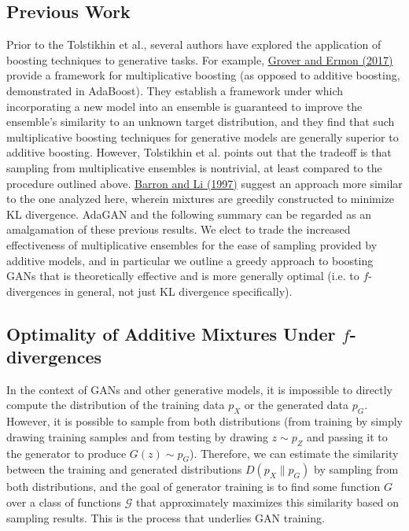 \documentclass[submission]{eptcs}
\newcommand{\calG}{\mathcal G}
\begin{document}
\subsection{Previous Work}

Prior to the Tolstikhin et al., several authors have explored the application of boosting techniques to generative tasks. For example, \href{https://arxiv.org/pdf/1702.08484.pdf}{Grover and Ermon (2017)} provide a framework for multiplicative boosting (as opposed to additive boosting, demonstrated in AdaBoost). They establish a framework under which incorporating a new model into an ensemble is guaranteed to improve the ensemble's similarity to an unknown target distribution, and they find that such multiplicative boosting techniques for generative models are generally superior to additive boosting. However, Tolstikhin et al. points out that the tradeoff is that sampling from multiplicative ensembles is nontrivial, at least compared to the procedure outlined above. \href{https://papers.nips.cc/paper_files/paper/1999/file/a0f3601dc682036423013a5d965db9aa-Paper.pdf}{Barron and Li (1997)} suggest an approach more similar to the one analyzed here, wherein mixtures are greedily constructed to minimize KL divergence. AdaGAN and the following summary can be regarded as an amalgamation of these previous results. We elect to trade the increased effectiveness of multiplicative ensembles for the ease of sampling provided by additive models, and in particular we outline a greedy approach to boosting GANs that is theoretically effective and is more generally optimal (i.e. to $f$-divergences in general, not just KL divergence specifically).

\subsection{Optimality of Additive Mixtures Under $f$-divergences}

In the context of GANs and other generative models, it is impossible to directly compute the distribution of the training data $p_X$ or the generated data $p_G$. However, it is possible to sample from both distributions (from training by simply drawing training samples and from testing by drawing $z \sim p_Z$ and passing it to the generator to produce $G(z) \sim p_G$). Therefore, we can estimate the similarity between the training and generated distributions $D(p_X \| p_G)$ by sampling from both distributions, and the goal of generator training is to find some function $G$ over a class of functions $\calG$ that approximately maximizes this similarity based on sampling results. This is the process that underlies GAN training. \\
\end{document}
